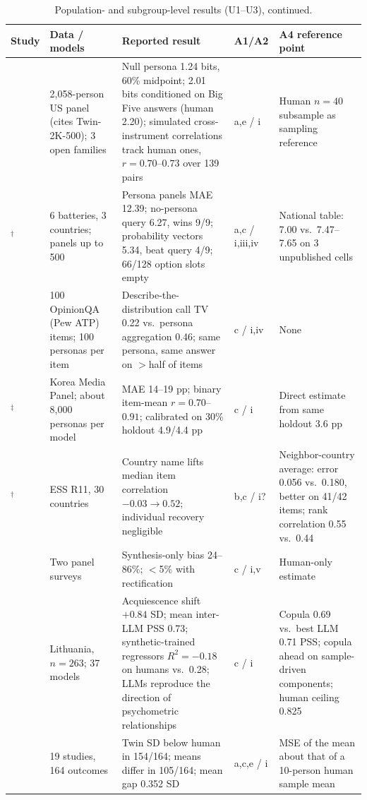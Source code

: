 \documentclass[11pt]{article}
\newcommand{\sa}{$^\dagger$}
\newcommand{\ab}{$^\ddagger$}
\begin{document}
\begin{table}[p]
\centering
\scriptsize
\caption{Population- and subgroup-level results (U1--U3), continued.}
\label{tab:dist2}
\begin{tabular}{@{}L{1.9cm}L{2.7cm}L{5.4cm}L{0.9cm}L{3.3cm}@{}}
\toprule
Study & Data / models & Reported result & A1/A2 & A4 reference point \\
\midrule
\citet{lee2026openweight} & 2,058-person US panel (cites Twin-2K-500); 3 open families & Null persona 1.24 bits, 60\% midpoint; 2.01 bits conditioned on Big Five answers (human 2.20); simulated cross-instrument correlations track human ones, $r=0.70$--$0.73$ over 139 pairs & a,e / i & Human $n{=}40$ subsample as sampling reference \\
\citet{doudkin2026}\sa & 6 batteries, 3 countries; panels up to 500 & Persona panels MAE 12.39; no-persona query 6.27, wins 9/9; probability vectors 5.34, beat query 4/9; 66/128 option slots empty & a,c / i,iii,iv & National table: 7.00 vs.\ 7.47--7.65 on 3 unpublished cells \\
\citet{jang2026} & 100 OpinionQA (Pew ATP) items; 100 personas per item & Describe-the-distribution call TV 0.22 vs.\ persona aggregation 0.46; same persona, same answer on $>$half of items & c / i,iv & None \\
\citet{kim2026korean}\ab & Korea Media Panel; about 8,000 personas per model & MAE 14--19 pp; binary item-mean $r=0.70$--$0.91$; calibrated on 30\% holdout 4.9/4.4 pp & c / i & Direct estimate from same holdout 3.6 pp \\
\citet{wang2026ess}\sa & ESS R11, 30 countries & Country name lifts median item correlation $-0.03 \to 0.52$; individual recovery negligible & b,c / i? & Neighbor-country average: error 0.056 vs.\ 0.180, better on 41/42 items; rank correlation 0.55 vs.\ 0.44 \\
\citet{krsteski2025} & Two panel surveys & Synthesis-only bias 24--86\%; $<$5\% with rectification & c / i,v & Human-only estimate \\
\citet{lukauskas2026} & Lithuania, $n=263$; 37 models & Acquiescence shift $+0.84$ SD; mean inter-LLM PSS 0.73; synthetic-trained regressors $R^2=-0.18$ on humans vs.\ 0.28; LLMs reproduce the direction of psychometric relationships & c / i & Copula 0.69 vs.\ best LLM 0.71 PSS; copula ahead on sample-driven components; human ceiling 0.825 \\
\citet{peng2025funhouse} & 19 studies, 164 outcomes & Twin SD below human in 154/164; means differ in 105/164; mean gap 0.352 SD & a,c,e / i & MSE of the mean about that of a 10-person human sample mean \\

\end{tabular}
\end{table}
\end{document}
